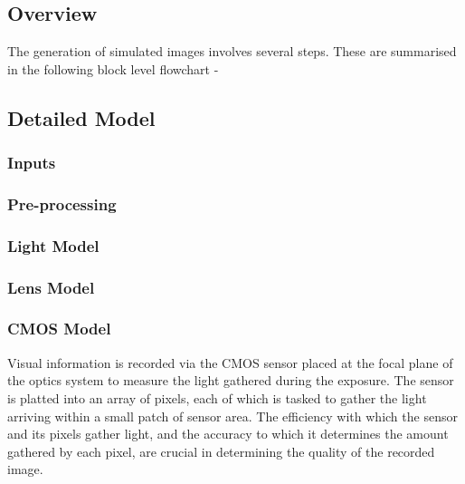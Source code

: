 \documentclass[../../main.tex]{subfiles}
\begin{document}
\subsection{Overview} %
The generation of simulated images involves several steps. These are summarised in the following block level flowchart -






\subsection{Detailed Model}
\blindtext

\subsubsection{Inputs}
\blindtext

\subsubsection{Pre-processing} %
\blindtext

\subsubsection{Light Model}
\blindtext

\subsubsection{Lens Model} %
\blindtext

\subsubsection{CMOS Model} %
Visual information is recorded via the CMOS sensor placed at the focal plane of the optics system to measure the light gathered during the exposure. The sensor is platted into an array of pixels, each of which is tasked to gather the light arriving within a small patch of sensor area. The efficiency with which the sensor and its pixels gather light, and the accuracy to which it determines the amount gathered by each pixel, are crucial in determining the quality of the recorded image. \cite{DSLRs} 
\end{document}
